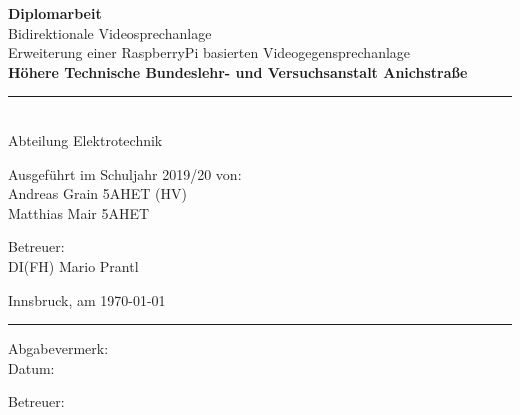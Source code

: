 \begin{center}
	\vspace*{2cm}
	\Huge\textbf{Diplomarbeit}\\
	\vspace*{2cm}
	\huge Bidirektionale Videosprechanlage\\
	\vspace*{0.5cm}
	\normalsize Erweiterung einer RaspberryPi basierten Videogegensprechanlage\\
	\vspace*{1.5cm}
	\textbf{Höhere Technische Bundeslehr- und Versuchsanstalt Anichstraße}\\
	\vspace*{0.5cm}
	\rule{0.75\linewidth}{0.4pt}\\
	\vspace*{0.5cm}
	Abteilung Elektrotechnik\\
	\vspace*{1cm}
	\begin{minipage}{0.425\linewidth}
		\begin{flushleft}
			Ausgeführt im Schuljahr 2019/20 von:\bigskip\\
			Andreas Grain 5AHET (HV)\\
			Matthias Mair 5AHET\\
		\end{flushleft}
	\end{minipage}
	\begin{minipage}{0.425\linewidth}
		\begin{flushright}
			Betreuer:\bigskip\\
			DI(FH) Mario Prantl\\
		\end{flushright}
	\end{minipage}
\end{center}
\vspace*{1cm}
\vfill
Innsbruck, am \today
\vspace*{1cm}
\hrule
\vspace*{1cm}
\begin{minipage}{0.49\linewidth}
	\begin{flushleft}
		Abgabevermerk:\\
		Datum:
	\end{flushleft}
\end{minipage}
\begin{minipage}{0.49\linewidth}
	\begin{flushleft}
		Betreuer:
	\end{flushleft}
\end{minipage}\\
\restoregeometry